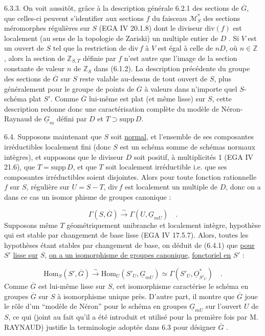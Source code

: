 6.3.3.  On voit aussitôt, grâce à la description générale 6.2.1 des sections de $\overline{G}$, que celles-ci peuvent s'identifier aux sections $f$ du faisceau $\mathcal{M}^*_S$ des sections méromorphes régulières sur $S$ (EGA IV 20.1.8) dont le diviseur $\mathrm{div}(f)$ est localement (au sens de la topologie de Zariski) un multiple entier de $D$ . Si $V$ est un ouvert de $S$ tel que la restriction de $\mathrm{div}\, f$ à $V$ est égal à celle de $nD$, où $n \in \mathbb{Z}$ , alors la section de $\mathbb{Z}_{S,T}$ définie par $f$ n'est autre que l'image de la section constante de valeur $n$ de $\mathbb{Z}_S$ dans (6.1.2). La description précédente du groupe des sections de $\overline{G}$ sur $S$ reste valable au-dessus de tout ouvert de $S$, plus généralement pour le groupe de points de $\overline{G}$ à valeurs dans n'importe quel $S$-schéma plat $S'$. Comme $\overline{G}$ lui-même est plat (et même lisse) sur $S$, cette description redonne donc une caractérisation complète du modèle de Néron-Raynaud de $\underline{G}_m$ défini par $D$ et $T \supset \mathrm{supp}\, D$.

6.4.  Supposons maintenant que $S$ soit \underline{normal}, et l'ensemble de ses composantes irréductibles localement fini (donc $S$ est un schéma somme de schémas normaux intègres), et supposons que le diviseur $D$ soit positif, à multiplicités 1 (EGA IV 21.6), que $T=\mathrm{supp}\, D$, et que $T$ soit localement irréductible i.e. que ses composantes irréductibles soient disjointes. Alors pour toute fonction rationnelle $f$ sur $S$, régulière sur $U = S-T$, $\mathrm{div}\, f$ est localement un multiple de $D$, donc on a dans ce cas un isomor%
phisme de groupes canonique :

\begin{equation}\tag{6.4.1}
\Gamma(S,\overline{G}) \overset{\sim}{\longrightarrow} \Gamma(U,\underline{G}_{mU}) \quad .
\end{equation}
Supposons même $T$ géométriquement unibranche et localement intègre, hypothèse qui est stable par changement de base lisse (EGA IV 17.5.7). Alors, toutes les hypothèses étant stables par changement de base, on déduit de (6.4.1) que \underline{pour} $S'$ \underline{lisse sur} $S$, \underline{on a un isomorphisme de groupes canonique}, \underline{fonctoriel en} $S'$ :

\begin{equation}\tag{6.4.2}
\mathrm{Hom}_S(S', \overline{G}) \overset{\sim}{\longrightarrow} \mathrm{Hom}_U(S'_U, \underline{G}_{mU}) \simeq \Gamma(S'_U , \underline{O}^*_{S'_U}) \quad .
\end{equation}
Comme $\overline{G}$ est lui-même lisse sur $S$, cet isomorphisme caractérise le schéma en groupes $\overline{G}$ sur $S$ à isomorphisme unique près. D'autre part, il montre que $\overline{G}$ joue le rôle d'un ``modèle de Néron'' pour le schéma en groupes $\underline{G}_{mU}$ sur l'ouvert $U$ de $S$, ce qui (joint au fait qu'il a été introduit et utilisé pour la première fois par M. RAYNAUD) justifie la terminologie adoptée dans 6.3 pour désigner $\overline{G}$ .

